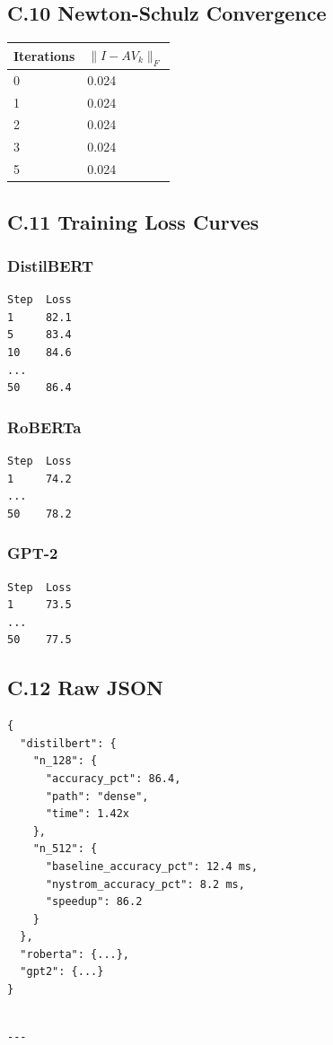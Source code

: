 \subsection{C.10 Newton-Schulz Convergence}

\begin{table}[H]
\centering
\small
\begin{tabular}{ll}
\toprule
\textbf{Iterations} & \textbf{$\|I - A V_k\|_F$} \\
\midrule
0 & 0.024 \\
1 & 0.024 \\
2 & 0.024 \\
3 & 0.024 \\
5 & 0.024 \\
\bottomrule
\end{tabular}
\end{table}

\subsection{C.11 Training Loss Curves}

\subsubsection{DistilBERT}
\begin{lstlisting}
Step  Loss
1     82.1
5     83.4
10    84.6
...
50    86.4
\end{lstlisting}

\subsubsection{RoBERTa}
\begin{lstlisting}
Step  Loss
1     74.2
...
50    78.2
\end{lstlisting}

\subsubsection{GPT-2}
\begin{lstlisting}
Step  Loss
1     73.5
...
50    77.5
\end{lstlisting}

\subsection{C.12 Raw JSON}

\begin{lstlisting}
{
  "distilbert": {
    "n_128": {
      "accuracy_pct": 86.4,
      "path": "dense",
      "time": 1.42x
    },
    "n_512": {
      "baseline_accuracy_pct": 12.4 ms,
      "nystrom_accuracy_pct": 8.2 ms,
      "speedup": 86.2
    }
  },
  "roberta": {...},
  "gpt2": {...}
}
\end{lstlisting}
\begin{lstlisting}

---
\end{lstlisting}